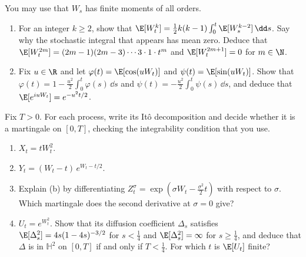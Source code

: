 
\begin{exercise}\label{ex:itf-moments}
\easy You may use that $W_s$ has finite moments of all orders.
\begin{enumerate}[label=(\alph*)]
  \item For an integer $k\ge2$, show that
    $\E[W_t^k]=\frac12k(k-1)\int_0^t\E[W_s^{k-2}]\,\dd s$. Say why the stochastic integral that
    appears has mean zero. Deduce that $\E[W_t^{2m}]=(2m-1)(2m-3)\cdots3\cdot1\cdot t^m$ and
    $\E[W_t^{2m+1}]=0$ for $m\in\N$.
  \item Fix $u\in\R$ and let $\varphi(t)=\E[\cos(uW_t)]$ and $\psi(t)=\E[\sin(uW_t)]$. Show that
    $\varphi(t)=1-\frac{u^2}2\int_0^t\varphi(s)\,\dd s$ and
    $\psi(t)=-\frac{u^2}2\int_0^t\psi(s)\,\dd s$, and deduce that $\E[e^{iuW_t}]=e^{-u^2t/2}$.
\end{enumerate}
\end{exercise}

\begin{exercise}[It\^o decompositions]\label{ex:itf-decompositions}
\easy Fix $T>0$. For each process, write its It\^o decomposition and decide whether it is a
martingale on $[0,T]$, checking the integrability condition that you use.
\begin{enumerate}[label=(\alph*)]
  \item $X_t=tW_t^2$.
  \item $Y_t=(W_t-t)\,e^{W_t-t/2}$.
  \item Explain (b) by differentiating $Z^\sigma_t=\exp(\sigma W_t-\frac{\sigma^2}2t)$ with respect to
    $\sigma$. Which martingale does the second derivative at $\sigma=0$ give?
  \item $U_t=e^{W_t^2}$. Show that its diffusion coefficient $\Delta_s$ satisfies
    $\E[\Delta_s^2]=4s(1-4s)^{-3/2}$ for $s<\frac14$ and $\E[\Delta_s^2]=\infty$ for $s\ge\frac14$, and
    deduce that $\Delta$ is in $\mathbb H^2$ on $[0,T]$ if and only if $T<\frac14$. For which $t$ is
    $\E[U_t]$ finite?
\end{enumerate}
\end{exercise}

